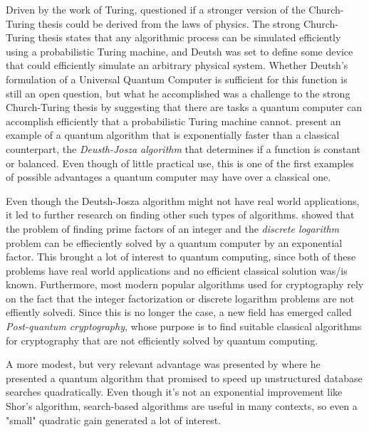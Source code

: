 \documentclass[../../dissertation.tex]{subfiles}
\begin{document}
Driven by the work of Turing, \cite{deutsch1985} questioned if a stronger version of the Church-Turing thesis could be derived from the laws of physics. The strong Church-Turing thesis states that any algorithmic process can be simulated efficiently using a probabilistic Turing machine, and Deutsh was set to define some device that could efficiently simulate an arbitrary physical system. Whether Deutsh's formulation of a Universal Quantum Computer is sufficient for this function is still an open question, but what he accomplished was a challenge to the strong Church-Turing thesis by suggesting that there are tasks a quantum computer can accomplish efficiently that a probabilistic Turing machine cannot. \cite{deutsch1992} present an example of a quantum algorithm that is exponentially faster than a classical counterpart, the \textit{Deusth-Josza algorithm } that determines if a function is constant or balanced. Even though of little practical use, this is one of the first examples of possible advantages a quantum computer may have over a classical one.\par
Even though the Deutsh-Josza algorithm might not have real world applications, it led to further research on finding other such types of algorithms. \cite{shor1994} showed that the problem of finding prime factors of an integer and the \textit{discrete logarithm} problem can be effieciently solved by a quantum computer by an exponential factor. This brought a lot of interest to quantum computing, since both of these problems have real world applications and no efficient classical solution was/is known. Furthermore, most modern popular algorithms used for cryptography rely on the fact that the integer factorization or discrete logarithm problems are not effiently solvedi. Since this is no longer the case, a new field has emerged called \textit{Post-quantum cryptography}, whose purpose is to find suitable classical algorithms for cryptography that are not efficiently solved by quantum computing.\par
A more modest, but very relevant advantage was presented by \cite{grover1996} where he presented a quantum algorithm that promised to speed up unstructured database searches quadratically. Even though it's not an exponential improvement like Shor's algorithm, search-based algorithms are useful in many contexts, so even a "small" quadratic gain generated a lot of interest.\par
\end{document}
